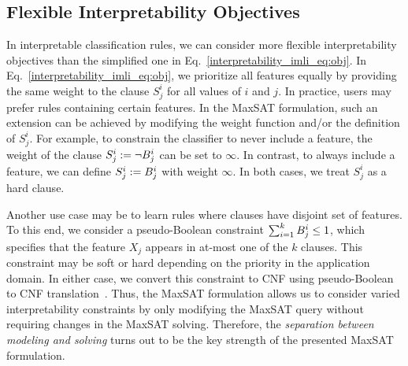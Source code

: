 	
\subsection{Flexible Interpretability Objectives}
\label{interpretability_imli_sec:complex_interpretability_objectives}
In interpretable classification rules, we can consider more flexible interpretability objectives than the simplified one in Eq.~\eqref{interpretability_imli_eq:obj}. In Eq.~\eqref{interpretability_imli_eq:obj}, we prioritize all features equally by providing the same weight to the clause $ S_j^i $ for all  values of $ i $ and $ j $. In practice, users may prefer rules containing certain features. In the MaxSAT formulation, such an extension can be achieved by modifying the weight function and/or the definition of  $ S_j^i $. For example, to constrain the classifier to never include a feature, the weight of the clause $ S_j^i := \neg B_j^i $ can be set to $ \infty $. In contrast, to always include a feature, we can define $ S_j^i := B_j^i $ with weight $ \infty $. In both cases, we treat $ S_j^i $ as a hard clause. 

Another use case may be to learn rules where clauses have disjoint set of features. To this end, we consider a pseudo-Boolean constraint $ \sum_{i=1}^k B^i_j \le 1 $, which specifies that the feature $ X_j $ appears in at-most one of the $ k $ clauses. This constraint may be soft or hard depending on the priority in the application domain. In either case, we convert this constraint to CNF using pseudo-Boolean to CNF translation~\cite{philipp2015pblib}. Thus, the MaxSAT formulation allows us to consider varied interpretability constraints by only modifying the MaxSAT query without requiring changes in the MaxSAT solving. Therefore, the \emph{separation between modeling and solving} turns out to be the key strength of the presented MaxSAT formulation.



